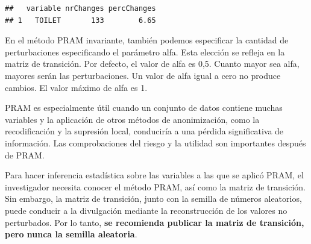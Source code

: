 \documentclass[]{book}
\newenvironment{Shaded}{\begin{snugshade}}{\end{snugshade}}
\newcommand{\CommentTok}[1]{\textcolor[rgb]{0.56,0.35,0.01}{\textit{#1}}}
\newcommand{\DataTypeTok}[1]{\textcolor[rgb]{0.13,0.29,0.53}{#1}}
\newcommand{\FloatTok}[1]{\textcolor[rgb]{0.00,0.00,0.81}{#1}}
\newcommand{\KeywordTok}[1]{\textcolor[rgb]{0.13,0.29,0.53}{\textbf{#1}}}
\newcommand{\NormalTok}[1]{#1}
\newcommand{\OperatorTok}[1]{\textcolor[rgb]{0.81,0.36,0.00}{\textbf{#1}}}
\newcommand{\StringTok}[1]{\textcolor[rgb]{0.31,0.60,0.02}{#1}}
\theoremstyle{definition}
\theoremstyle{definition}
\theoremstyle{definition}
\theoremstyle{definition}
\theoremstyle{remark}
\begin{document}
\begin{Shaded}
\end{Shaded}

\begin{verbatim}
##   variable nrChanges percChanges
## 1   TOILET       133        6.65
\end{verbatim}

En el método PRAM invariante, también podemos especificar la cantidad de perturbaciones especificando el parámetro alfa. Esta elección se refleja en la matriz de transición. Por defecto, el valor de alfa es 0,5. Cuanto mayor sea alfa, mayores serán las perturbaciones. Un valor de alfa igual a cero no produce cambios. El valor máximo de alfa es 1.

PRAM es especialmente útil cuando un conjunto de datos contiene muchas variables y la aplicación de otros métodos de anonimización, como la recodificación y la supresión local, conduciría a una pérdida significativa de información. Las comprobaciones del riesgo y la utilidad son importantes después de PRAM.

Para hacer inferencia estadística sobre las variables a las que se aplicó PRAM, el investigador necesita conocer el método PRAM, así como la matriz de transición. Sin embargo, la matriz de transición, junto con la semilla de números aleatorios, puede conducir a la divulgación mediante la reconstrucción de los valores no perturbados. Por lo tanto, \textbf{se recomienda publicar la matriz de transición, pero nunca la semilla aleatoria}.
\end{document}

